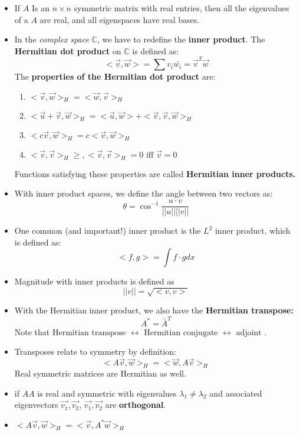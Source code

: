 \documentclass[10pt,letterpaper]{article}
\begin{document}
\begin{itemize}
\item If $A$ Is an $n \times n$ symmetric matrix with real entries, then all the eigenvalues of a $A$ are real, and all eigenspaces have real bases. 

\item In the \textit{complex space }$\mathbb{C}$, we have to redefine the \textbf{inner product}. The \textbf{Hermitian dot product} on $\mathbb{C}$ is defined as: 
$$<\vec{v},\vec{w}>=\sum v_i\bar{w_i}=\vec{v}^T\vec{w}$$
The \textbf{properties of the Hermitian dot product }are: 
\begin{enumerate}
\item $<\vec{v}, \vec{w}>_H=<\vec{w}, \vec{v}>_H$
\item $<\vec{u}+\vec{v},\vec{w}>_H=<\vec{u},\vec{w}>+<\vec{v},\vec{v},\vec{w}>_H$
\item $<c\vec{v},\vec{w}>_H=c<\vec{v},\vec{w}>_H$
\item $<\vec{v},\vec{v}>_H\geq , <\vec{v},\vec{v}>_H=0 \mbox{ iff } \vec{v}=0$
\end{enumerate}
Functions satisfying these properties are called \textbf{Hermitian inner products.}

\item With inner product spaces, we define the angle between two vectors as: 
$$\theta = \cos^{-1}\frac{u \cdot v}{||u||||v||}$$

\item One common (and important!) inner product is the $L^2$ inner product, which is defined as: 
$$<f,g> = \int f\cdot g dx$$

\item Magnitude with inner products is defined as 
$$||v|| = \sqrt{<v,v>}$$

\item With the Hermitian inner product, we also have the \textbf{Hermitian transpose:}
$$A^*=\bar{A}^T$$ 
Note that $\mbox{Hermitian transpose } \leftrightarrow \mbox{ Hermitian conjugate } \leftrightarrow \mbox{ adjoint }$. 
\item Transposes relate to symmetry by definition: 
$$ <A\vec{v},\vec{w}>_H=<\vec{w},A\vec{v}>_H$$ 
Real symmetric matrices are Hermitian as well. 

\item if $AA$ is real and symmetric with eigenvalues $\lambda_1 \neq \lambda_2$ and associated eigenvectors $\vec{v_1}, \vec{v_2}$, $\vec{v_1}, \vec{v_2}$ are \textbf{orthogonal}. 

\item $<A\vec{v}, \vec{w}>_H=<\vec{v},A^*\vec{w}>_H$


\end{itemize}
\end{document}
